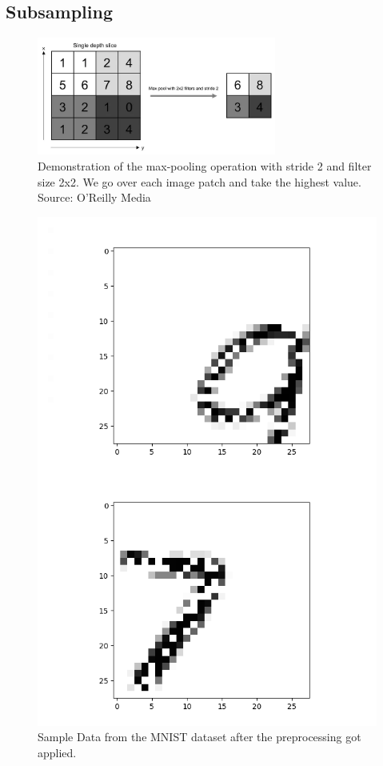 \newpage
 
\subsection{Subsampling}

\begin{figure}[h]
    \centering
    \includegraphics[width=0.7\textwidth]{figures/pooling.png}
    \caption{Demonstration of the max-pooling operation with stride 2 and filter size 2x2. 
    We go over each image patch and take the highest value.
    Source: O’Reilly Media}
    \label{fig:subsampling}
\end{figure}

\begin{figure}
    \includegraphics[width=0.7\linewidth]{figures/mnist_sample_combine_2.png}
    \caption{Sample Data from the MNIST dataset after the preprocessing got applied.}
    \label{fig:preprocessing}
\end{figure}

